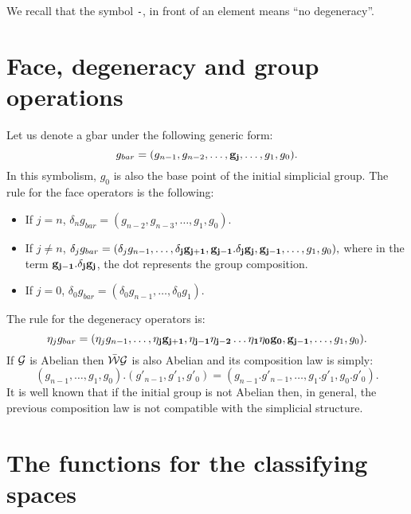 We recall that the symbol {\tt -}, in front of an element means ``no degeneracy''.

\section {Face, degeneracy and group operations}

Let us denote a gbar under the following generic form:
$$g_{bar}=(g_{n-1}, g_{n-2}, \ldots, {\bf g_j}, \ldots, g_1, g_0).$$
In this symbolism, $g_0$ is also the base point of the initial simplicial group.
The rule for the face operators is the following:
\begin{itemize}
\item If $j=n$, $\delta_n g_{bar}= (g_{n-2}, g_{n-3}, \ldots, g_1, g_0).$
\item If $j \not=n$,
  $\delta_j g_{bar}= (\delta_j g_{n-1}, \ldots, {\bf \delta_j g_{j+1}, g_{j-1}.\delta_j g_j, g_{j-1}}, \ldots, g_1, g_0),$
where in the term $\bf g_{j-1}.\delta_j g_j$, the dot represents the group composition.
\item If $j=0$, $\delta_0 g_{bar}= (\delta_0 g_{n-1}, \ldots, \delta_0 g_1).$
\end{itemize}
The rule for the degeneracy operators is:
$$\eta_j g_{bar}=
 (\eta_j g_{n-1}, \ldots, {\bf \eta_j g_{j+1}, \eta_{j-1}\eta_{j-2}\ldots\eta_1\eta_0 g_0, g_{j-1}}, \ldots, g_1, g_0).$$
If ${\cal G}$ is Abelian then $\bar{\cal W}{\cal G}$ is also  Abelian  and its
composition law is simply:
$$(g_{n-1}, \ldots, g_1, g_0).(g'_{n-1}, g'_1, g'_0)=
  (g_{n-1}.g'_{n-1},  \ldots, g_1.g'_1, g_0.g'_0).$$
It is well known that if the initial group is not Abelian then, in general, the previous
composition law is not compatible with the simplicial structure.

\section {The functions for the classifying spaces}

